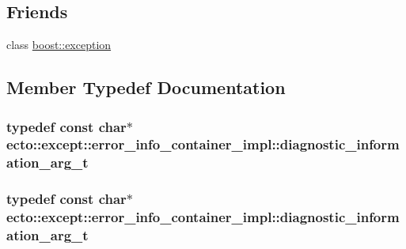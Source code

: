 \subsection*{Friends}
\begin{DoxyCompactItemize}
\item 
class \hyperlink{classecto_1_1except_1_1error__info__container__impl_a699fdb1191a8f1fbc7bd591cc3d757aa}{boost\-::exception}
\end{DoxyCompactItemize}


\subsection{Member Typedef Documentation}
\hypertarget{classecto_1_1except_1_1error__info__container__impl_a16f5ebd1abcacd60ddbd919ea166958e}{
\subsubsection[{diagnostic\-\_\-information\-\_\-arg\-\_\-t}]{\setlength{\rightskip}{0pt plus 5cm}typedef const char$\ast$ {\bf ecto\-::except\-::error\-\_\-info\-\_\-container\-\_\-impl\-::diagnostic\-\_\-information\-\_\-arg\-\_\-t}\hspace{0.3cm}{\ttfamily [private]}}}\label{classecto_1_1except_1_1error__info__container__impl_a16f5ebd1abcacd60ddbd919ea166958e}
\hypertarget{classecto_1_1except_1_1error__info__container__impl_a16f5ebd1abcacd60ddbd919ea166958e}{
\subsubsection[{diagnostic\-\_\-information\-\_\-arg\-\_\-t}]{\setlength{\rightskip}{0pt plus 5cm}typedef const char$\ast$ {\bf ecto\-::except\-::error\-\_\-info\-\_\-container\-\_\-impl\-::diagnostic\-\_\-information\-\_\-arg\-\_\-t}\hspace{0.3cm}{\ttfamily [private]}}}\label{classecto_1_1except_1_1error__info__container__impl_a16f5ebd1abcacd60ddbd919ea166958e}
